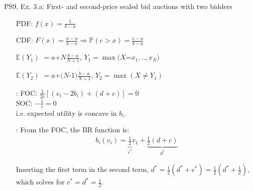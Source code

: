 \begin{frame}{PS9, Ex. 3.a: First- and second-price sealed bid auctions with two bidders}
\begin{multicols}{2}
\begin{enumerate}
        \item[PDF:] $f(x)=\frac{1}{b-a}$
        \item[CDF:] $F(x)=\frac{x-a}{b-a}\Rightarrow\mathbb{P}(c>x)=\frac{c-a}{b-a}$
        \item[$\mathbb{E}(Y_1)$] $=a$+$N\frac{b-a}{N+1}$, $Y_1=\max(X$=$x_1,..,x_N)$
        \item[$\mathbb{E}(Y_2)$] $=a$+$(N$-1$)\frac{b-a}{N+1}$, $Y_2=\max(X\neq Y_1)$
        \item[\nth{2}:] FOC: $\frac{1}{2c}[(v_i-2b_i)+(d+c)]=0$\\
                        SOC: $-\frac{1}{c}=0$\\
                        i.e. expected utility is concave in $b_i$.
        \item[\nth{3}:] From the FOC, the BR function is:\vspace{-6pt}
                        \begin{align*}
                          b_i(v_i)=\underbrace{\frac{1}{2}}_{c^*}v_1+\underbrace{\frac{1}{2}(d+c)}_{d^*}
                        \end{align*}
        \item[]         \vspace{-6pt} Inserting the first term in the second term, $d^*=\frac{1}{2}(d^*+c^*)=\frac{1}{2}(d^*+\frac{1}{2})$, which solves for $c^*=d^*=\frac{1}{2}$.
      \end{enumerate}
      \vfill\null
    \end{multicols}
\end{frame}


